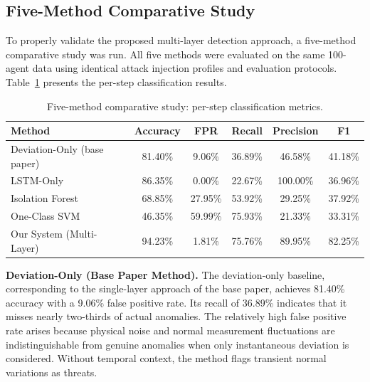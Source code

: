 \subsection{Five-Method Comparative Study}

To properly validate the proposed multi-layer detection approach, a five-method comparative study was run. All five methods were evaluated on the same 100-agent data using identical attack injection profiles and evaluation protocols. Table~\ref{tab:five_method} presents the per-step classification results.

\begin{table}[H]
\centering
\caption{Five-method comparative study: per-step classification metrics.}
\label{tab:five_method}
\begin{tabular}{|l|c|c|c|c|c|}
\hline
\textbf{Method} & \textbf{Accuracy} & \textbf{FPR} & \textbf{Recall} & \textbf{Precision} & \textbf{F1} \\ \hline
Deviation-Only (base paper) & 81.40\% & 9.06\% & 36.89\% & 46.58\% & 41.18\% \\ \hline
LSTM-Only & 86.35\% & 0.00\% & 22.67\% & 100.00\% & 36.96\% \\ \hline
Isolation Forest & 68.85\% & 27.95\% & 53.92\% & 29.25\% & 37.92\% \\ \hline
One-Class SVM & 46.35\% & 59.99\% & 75.93\% & 21.33\% & 33.31\% \\ \hline
Our System (Multi-Layer) & 94.23\% & 1.81\% & 75.76\% & 89.95\% & 82.25\% \\ \hline
\end{tabular}
\end{table}

\par \vspace{0.35cm}

\noindent
\textbf{Deviation-Only (Base Paper Method).}
The deviation-only baseline, corresponding to the single-layer approach of the base paper, achieves 81.40\% accuracy with a 9.06\% false positive rate. Its recall of 36.89\% indicates that it misses nearly two-thirds of actual anomalies. The relatively high false positive rate arises because physical noise and normal measurement fluctuations are indistinguishable from genuine anomalies when only instantaneous deviation is considered. Without temporal context, the method flags transient normal variations as threats.

\par \vspace{0.35cm}

